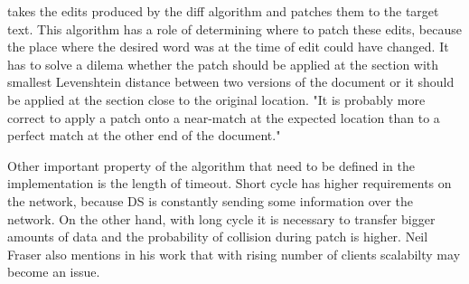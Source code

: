 \documentclass[12pt,oneside]{fithesis2}
\begin{document}
\par \underline{} takes the edits produced by the diff algorithm and patches them to the target text. This algorithm has a role of determining where to patch these edits, because the place where the desired word was at the time of edit could have changed. It has to solve a dilema whether the patch should be applied at the section with smallest Levenshtein distance \cite{Levenshtein} between two versions of the document or it should be applied at the section close to the original location. "It is probably more correct to apply a patch onto a near-match at the expected location than to a perfect match at the other end of the document."\cite{Fraser}
\par Other important property of the algorithm that need to be defined in the implementation is the length of timeout. Short cycle has higher requirements on the network, because DS is constantly sending some information over the network. On the other hand, with long cycle it is necessary to transfer bigger amounts of data and the probability of collision during patch is higher. Neil Fraser also mentions in his work that with rising number of clients scalabilty may become an issue.
\end{document}
